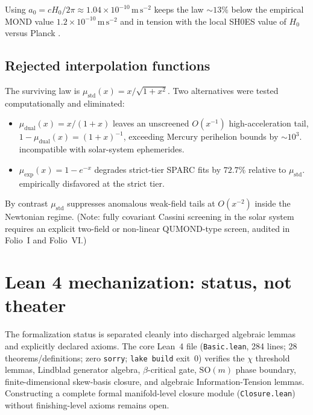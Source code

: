 \documentclass{alienfolio}
\begin{document}
Using $a_{0} = cH_{0}/2\pi \approx 1.04 \times 10^{-10}\,\mathrm{m\,s^{-2}}$
keeps the law $\sim 13\%$ below the empirical MOND value
$1.2 \times 10^{-10}\,\mathrm{m\,s^{-2}}$ and in tension with the local
SH0ES value of $H_{0}$ \cite{riess22} versus Planck \cite{planck18}.

\subsection{Rejected interpolation functions}
\label{sec:rejected-mu}

The surviving law is $\mu_{\mathrm{std}}(x) = x/\sqrt{1+x^{2}}$. Two
alternatives were tested computationally and eliminated:

\begin{itemize}
\item $\mu_{\mathrm{dual}}(x) = x/(1+x)$ leaves an unscreened
$O(x^{-1})$ high-acceleration tail,
$1-\mu_{\mathrm{dual}}(x) = (1+x)^{-1}$, exceeding Mercury perihelion
bounds by $\sim 10^{3}$.  incompatible with solar-system
ephemerides.
\item $\mu_{\mathrm{exp}}(x) = 1-e^{-x}$ degrades strict-tier SPARC
fits by $72.7\%$ relative to $\mu_{\mathrm{std}}$.
 empirically disfavored at the strict tier.
\end{itemize}

By contrast $\mu_{\mathrm{std}}$ suppresses anomalous weak-field
tails at $O(x^{-2})$ inside the Newtonian regime. (Note: fully covariant
Cassini screening in the solar system requires an explicit two-field or
non-linear QUMOND-type screen, audited in Folio~I and Folio~VI.)

\goldrule

\section{Lean 4 mechanization: status, not theater}
\label{sec:lean}

The formalization status is separated cleanly into discharged algebraic
lemmas and explicitly declared axioms. The core Lean~4 file
(\texttt{Basic.lean}, 284 lines; 28 theorems/definitions; zero
\texttt{sorry}; \texttt{lake build} exit~0) verifies the $\chi$ threshold
lemmas, Lindblad generator algebra, $\beta$-critical gate,
$\mathrm{SO}(m)$ phase boundary, finite-dimensional skew-basis closure,
and algebraic Information-Tension lemmas. Constructing a complete
formal manifold-level closure module (\texttt{Closure.lean}) without
finishing-level axioms remains open.
\end{document}
